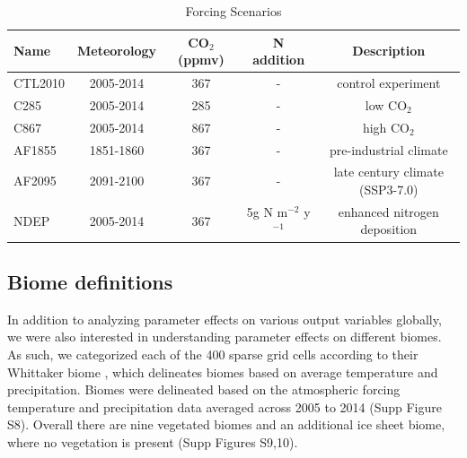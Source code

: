 \documentclass[draft]{agujournal2019}
\begin{document}
 

\label{sect:exps}
 \begin{table}[h]
 \caption{Forcing Scenarios}
 \centering
 \begin{tabular}{l c c c c}
 \hline
  Name  & Meteorology & CO$_2$ (ppmv) & N addition & Description \\
 \hline
   CTL2010  & 2005-2014 & 367 & - & control experiment\\
   C285        & 2005-2014 & 285 & - & low CO$_2$ \\
   C867        & 2005-2014 & 867 & - & high CO$_2$ \\
   AF1855    & 1851-1860 & 367 & - & pre-industrial climate \\
   AF2095    & 2091-2100 & 367 & - & late century climate (SSP3-7.0) \\
   NDEP      & 2005-2014 & 367 & 5g N m$^{-2}$  y$^{-1}$ & enhanced nitrogen deposition \\
 \hline
 \end{tabular}
 \label{tab:exps}
 \end{table}



\subsection{Biome definitions}
\label{sect:whit}
In addition to analyzing parameter effects on various output variables globally, we were also interested in understanding parameter effects on different biomes. As such, we categorized each of the 400 sparse grid cells according to their Whittaker biome \cite{whittaker1970}, which delineates biomes based on average temperature and precipitation. Biomes were delineated based on the atmospheric forcing temperature and precipitation data averaged across 2005 to 2014 (Supp Figure S8). Overall there are nine vegetated biomes and an additional ice sheet biome, where no vegetation is present (Supp Figures S9,10). 
\end{document}
